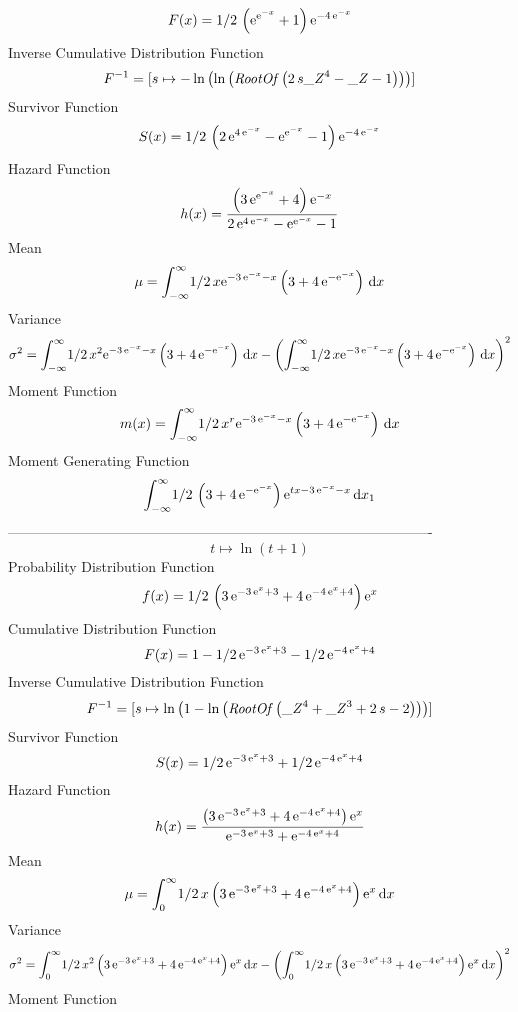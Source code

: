 \documentclass[12pt]{article}
\begin{document}
 $$F(x)=1/2\, \left( {{\rm e}^{{{\rm e}^{-x}}}}+1 \right) {{\rm e}^{-4\,{
{\rm e}^{-x}}}}
$$ Inverse Cumulative Distribution Function 
  $$F^{-1} = [s\mapsto -\ln  \left( \ln  \left( {\it RootOf} \left( 2\,s{{\it \_Z}}
^{4}-{\it \_Z}-1 \right)  \right)  \right) ]
$$Survivor Function 
 $$ S(x)=1/2\, \left( 2\,{{\rm e}^{4\,{{\rm e}^{-x}}}}-{{\rm e}^{{{\rm e}^{-x}}
}}-1 \right) {{\rm e}^{-4\,{{\rm e}^{-x}}}}
$$ Hazard Function 
 $$ h(x)={\frac { \left( 3\,{{\rm e}^{{{\rm e}^{-x}}}}+4 \right) {{\rm e}^{-x}}
}{2\,{{\rm e}^{4\,{{\rm e}^{-x}}}}-{{\rm e}^{{{\rm e}^{-x}}}}-1}}
$$Mean 
 $$ \mu=\int_{-\infty }^{\infty }\!1/2\,x{{\rm e}^{-3\,{{\rm e}^{-x}}-x}}
 \left( 3+4\,{{\rm e}^{-{{\rm e}^{-x}}}} \right) \,{\rm d}x
$$ Variance 
 $$ \sigma^2 = \int_{-\infty }^{\infty }\!1/2\,{x}^{2}{{\rm e}^{-3\,{{\rm e}^{-x}}-x}
} \left( 3+4\,{{\rm e}^{-{{\rm e}^{-x}}}} \right) \,{\rm d}x- \left( 
\int_{-\infty }^{\infty }\!1/2\,x{{\rm e}^{-3\,{{\rm e}^{-x}}-x}}
 \left( 3+4\,{{\rm e}^{-{{\rm e}^{-x}}}} \right) \,{\rm d}x \right) ^{
2}
$$Moment Function 
 $$ m(x) = \int_{-\infty }^{\infty }\!1/2\,{x}^{r}{{\rm e}^{-3\,{{\rm e}^{-x}}-x}
} \left( 3+4\,{{\rm e}^{-{{\rm e}^{-x}}}} \right) \,{\rm d}x
$$ Moment Generating Function 
 $$\int_{-\infty }^{\infty }\!1/2\, \left( 3+4\,{{\rm e}^{-{{\rm e}^{-x}}
}} \right) {{\rm e}^{tx-3\,{{\rm e}^{-x}}-x}}\,{\rm d}x_{{1}}
$$-------------------------------------------------------------------------------------------  \\$$t\mapsto \ln  \left( t+1 \right) 
$$Probability Distribution Function 
$$  f(x)=1/2\, \left( 3\,{{\rm e}^{-3\,{{\rm e}^{x}}+3}}+4\,{{\rm e}^{-4\,{
{\rm e}^{x}}+4}} \right) {{\rm e}^{x}}
$$Cumulative Distribution Function  
 $$F(x)=1-1/2\,{{\rm e}^{-3\,{{\rm e}^{x}}+3}}-1/2\,{{\rm e}^{-4\,{{\rm e}^{x}
}+4}}
$$ Inverse Cumulative Distribution Function 
  $$F^{-1} = [s\mapsto \ln  \left( 1-\ln  \left( {\it RootOf} \left( {{\it \_Z}}^{4
}+{{\it \_Z}}^{3}+2\,s-2 \right)  \right)  \right) ]
$$Survivor Function 
 $$ S(x)=1/2\,{{\rm e}^{-3\,{{\rm e}^{x}}+3}}+1/2\,{{\rm e}^{-4\,{{\rm e}^{x}}+
4}}
$$ Hazard Function 
 $$ h(x)={\frac { \left( 3\,{{\rm e}^{-3\,{{\rm e}^{x}}+3}}+4\,{{\rm e}^{-4\,{
{\rm e}^{x}}+4}} \right) {{\rm e}^{x}}}{{{\rm e}^{-3\,{{\rm e}^{x}}+3}
}+{{\rm e}^{-4\,{{\rm e}^{x}}+4}}}}
$$Mean 
 $$ \mu=\int_{0}^{\infty }\!1/2\,x \left( 3\,{{\rm e}^{-3\,{{\rm e}^{x}}+3}}+4
\,{{\rm e}^{-4\,{{\rm e}^{x}}+4}} \right) {{\rm e}^{x}}\,{\rm d}x
$$ Variance 
 $$ \sigma^2 = \int_{0}^{\infty }\!1/2\,{x}^{2} \left( 3\,{{\rm e}^{-3\,{{\rm e}^{x}}
+3}}+4\,{{\rm e}^{-4\,{{\rm e}^{x}}+4}} \right) {{\rm e}^{x}}\,{\rm d}
x- \left( \int_{0}^{\infty }\!1/2\,x \left( 3\,{{\rm e}^{-3\,{{\rm e}^
{x}}+3}}+4\,{{\rm e}^{-4\,{{\rm e}^{x}}+4}} \right) {{\rm e}^{x}}
\,{\rm d}x \right) ^{2}
$$Moment Function 
\end{document}
